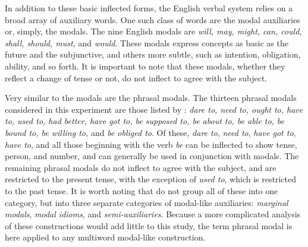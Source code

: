 \documentclass[main.tex]{subfiles}
\begin{document}
In addition to these basic inflected forms, the English verbal system relies on a broad array of auxiliary words. One such class of words are the modal auxiliaries or, simply, the modals. The nine English modals are \textit{will, may, might, can, could, shall, should, must,} and \textit{would}. These modals express concepts as basic as the future and the subjunctive, and others more subtle, such as intention, obligation, ability, and so forth. It is important to note that these modals, whether they reflect a change of tense or not, do not inflect to agree with the subject. 

Very similar to the modals are the phrasal modals. The thirteen phrasal modals considered in this experiment are those listed by \citet[pp. 136-47]{quirk:1985}: \textit{dare to, need to, ought to, have to, used to, had better, have got to, be supposed to, be about to, be able to, be bound to, be willing to,} and \textit{be obliged to}. Of these, \textit{dare to}, \textit{need to}, \textit{have got to}, \textit{have to}, and all those beginning with the verb \textit{be} can be inflected to show tense, person, and number, and can generally be used in conjunction with modals. The remaining phrasal modals do not inflect to agree with the subject, and are restricted to the present tense, with the exception of \textit{used to}, which is restricted to the past tense. It is worth noting that \citet{quirk:1985} do not group all of these into one category, but into three separate categories of modal-like auxiliaries: \textit{marginal modals}, \textit{modal idioms}, and \textit{semi-auxiliaries}. Because a more complicated analysis of these constructions would add little to this study, the term phrasal modal is here applied to any multiword modal-like construction.
\end{document}
